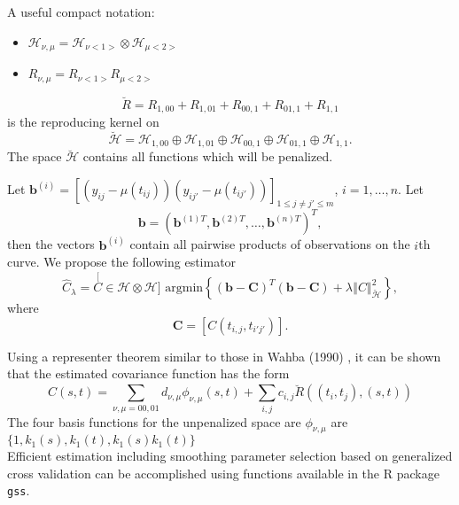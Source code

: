 \documentclass{beamer}
\renewcommand{\H}{\mathcal{H}}
\begin{document}
\begin{frame}
A useful compact notation:
\begin{itemize}
\item $\H_{\nu, \mu}=\H_{\nu <1>}\otimes \H_{\mu <2>}$ 
\item $R_{\nu, \mu}=R_{\nu <1>}R_{\mu <2>}$
\end{itemize}

\[
\breve{R} = R_{1,00}+R_{1,01}+R_{00,1}+R_{01,1}+R_{1,1}\]
 is the reproducing kernel on 
 \[
 \breve{\H} =  \H_{1,00}\oplus\H_{1,01}\oplus\H_{00,1}\oplus\H_{01,1}\oplus\H_{1,1}.
 \] 
 \noindent The space $\breve{\H}$ contains all functions which will be penalized.
\end{frame}

\begin{frame}

Let $\mathbf{b}^{(i)} = [(y_{ij}-\mu(t_{ij}))(y_{ij'}-\mu(t_{ij'}))]_{1\leq j\neq j'\leq m}$, $i=1, \dots, n$. Let
\[
\mathbf{b} = (\mathbf{b}^{(1)T}, \mathbf{b}^{(2)T}, \dots, \mathbf{b}^{(n)T}   )^T,
\]
then the vectors $\mathbf{b}^{(i)}$ contain all pairwise products of observations on the $i$th curve. We propose the following estimator
\[
\widehat{C}_{\lambda}=\stackrel[C \in \H\otimes \H]{}{\text{ argmin}} \left\{ (\mathbf{b} - \mathbf{C})^T(\mathbf{b} - \mathbf{C})+\lambda\left\Vert C\right\Vert _{\breve{\H}}^{2} \right\},
\]
 where
\[
\mathbf{C} = [C(t_{i,j}, t_{i'j'})].
\]
\end{frame}

\begin{frame}
Using a representer theorem similar to those in Wahba (1990) , it can be shown that the estimated covariance function has the form
\begin{equation}
		\hat{C}(s,t) = \sum_{\nu, \mu=00,01}d_{\nu,\mu}\phi_{\nu,\mu}(s,t) + \sum_{i,j}c_{i,j}\breve{R}((t_i,t_j),(s,t))
\end{equation}
 The four basis functions for the unpenalized space are $\phi_{\nu,\mu}$ are $\{ 1, k_1(s), k_1(t), k_1(s)k_1(t)  \}$\\[1cm]
Efficient estimation including smoothing parameter selection based on generalized cross validation can be accomplished using functions available in the R package {\tt gss}.
\end{frame}
\end{document}
